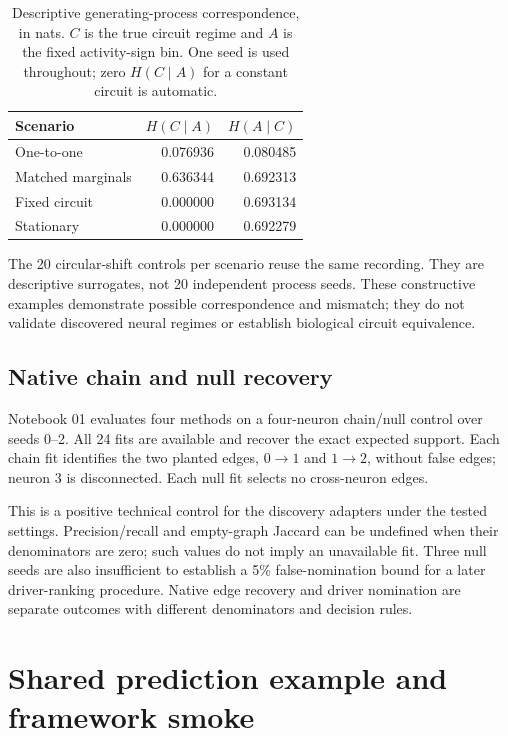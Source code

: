 \documentclass[11pt,a4paper]{article}
\begin{document}
\begin{table}[htbp]
\centering
\caption{Descriptive generating-process correspondence, in nats. $C$ is the true
circuit regime and $A$ is the fixed activity-sign bin. One seed is used throughout;
zero $H(C\mid A)$ for a constant circuit is automatic.}
\label{tab:designed}
\begin{tabular}{@{}lrr@{}}
\toprule
Scenario & $H(C\mid A)$ & $H(A\mid C)$ \\
\midrule
One-to-one & 0.076936 & 0.080485 \\
Matched marginals & 0.636344 & 0.692313 \\
Fixed circuit & 0.000000 & 0.693134 \\
Stationary & 0.000000 & 0.692279 \\
\bottomrule
\end{tabular}
\end{table}

The 20 circular-shift controls per scenario reuse the same recording. They are
descriptive surrogates, not 20 independent process seeds. These constructive
examples demonstrate possible correspondence and mismatch; they do not validate
discovered neural regimes or establish biological circuit equivalence.

\subsection{Native chain and null recovery}

Notebook 01 evaluates four methods on a four-neuron chain/null control over seeds
0--2. All 24 fits are available and recover the exact expected support. Each chain
fit identifies the two planted edges, $0\to1$ and $1\to2$, without false edges;
neuron 3 is disconnected. Each null fit selects no cross-neuron edges.

This is a positive technical control for the discovery adapters under the tested
settings. Precision/recall and empty-graph Jaccard can be undefined when their
denominators are zero; such values do not imply an unavailable fit. Three null
seeds are also insufficient to establish a 5\% false-nomination bound for a later
driver-ranking procedure. Native edge recovery and driver nomination are separate
outcomes with different denominators and decision rules.

\section{Shared prediction example and framework smoke}
\label{sec:prediction}
\end{document}
